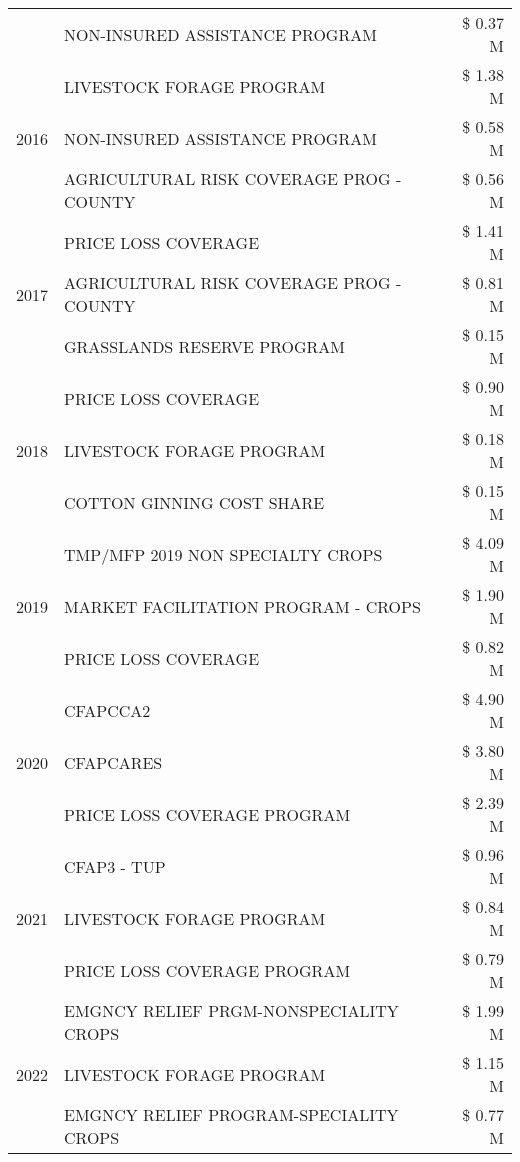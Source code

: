 \begin{tabular}{llr}
 & NON-INSURED ASSISTANCE PROGRAM & \$ 0.37 M \\
\cline{1-3}
\multirow[t]{3}{*}{2016} & LIVESTOCK FORAGE PROGRAM & \$ 1.38 M \\
 & NON-INSURED ASSISTANCE PROGRAM & \$ 0.58 M \\
 & AGRICULTURAL RISK COVERAGE PROG - COUNTY & \$ 0.56 M \\
\cline{1-3}
\multirow[t]{3}{*}{2017} & PRICE LOSS COVERAGE & \$ 1.41 M \\
 & AGRICULTURAL RISK COVERAGE PROG - COUNTY & \$ 0.81 M \\
 & GRASSLANDS RESERVE PROGRAM & \$ 0.15 M \\
\cline{1-3}
\multirow[t]{3}{*}{2018} & PRICE LOSS COVERAGE & \$ 0.90 M \\
 & LIVESTOCK FORAGE PROGRAM & \$ 0.18 M \\
 & COTTON GINNING COST SHARE & \$ 0.15 M \\
\cline{1-3}
\multirow[t]{3}{*}{2019} & TMP/MFP 2019 NON SPECIALTY CROPS & \$ 4.09 M \\
 & MARKET FACILITATION PROGRAM - CROPS & \$ 1.90 M \\
 & PRICE LOSS COVERAGE & \$ 0.82 M \\
\cline{1-3}
\multirow[t]{3}{*}{2020} & CFAPCCA2 & \$ 4.90 M \\
 & CFAPCARES & \$ 3.80 M \\
 & PRICE LOSS COVERAGE PROGRAM & \$ 2.39 M \\
\cline{1-3}
\multirow[t]{3}{*}{2021} & CFAP3 - TUP & \$ 0.96 M \\
 & LIVESTOCK FORAGE PROGRAM & \$ 0.84 M \\
 & PRICE LOSS COVERAGE PROGRAM & \$ 0.79 M \\
\cline{1-3}
\multirow[t]{3}{*}{2022} & EMGNCY RELIEF PRGM-NONSPECIALITY CROPS & \$ 1.99 M \\
 & LIVESTOCK FORAGE PROGRAM & \$ 1.15 M \\
 & EMGNCY RELIEF PROGRAM-SPECIALITY CROPS & \$ 0.77 M \\
\cline{1-3}
\bottomrule
\end{tabular}
